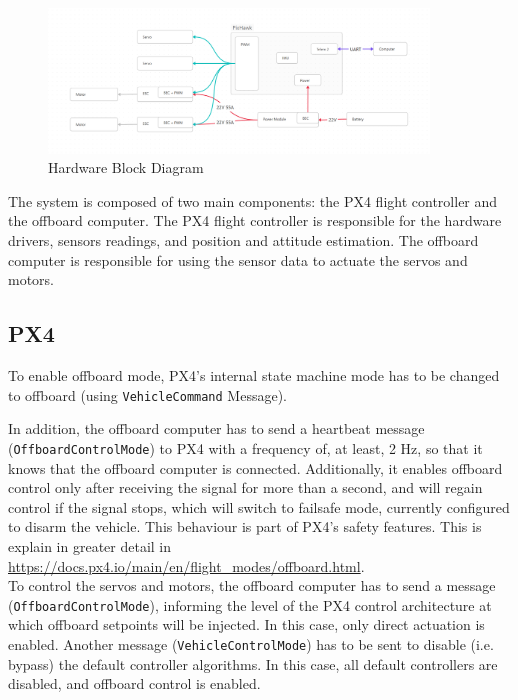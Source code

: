 \documentclass[a4paper]{article}
\begin{document}
\begin{figure}[H]
    \centering
    \includegraphics[width=0.9\textwidth, trim=30 30 30 30, clip]{imgs/Hardware Diagram.png}
    \caption{Hardware Block Diagram}
    \label{fig:hardware_block_diagram}
\end{figure}

The system is composed of two main components: the PX4 flight controller and the offboard computer. 
The PX4 flight controller is responsible for the hardware drivers, sensors readings, and position and attitude estimation. 
The offboard computer is responsible for using the sensor data to actuate the servos and motors. 

\subsection{PX4}

To enable offboard mode, PX4's internal state machine mode has to be changed to offboard (using \verb|VehicleCommand| Message).

In addition, the offboard computer has to send a heartbeat message (\verb|OffboardControlMode|) to PX4 with a frequency of, at least, 2 Hz, so that it knows that the offboard computer is connected. Additionally, it enables offboard control only after receiving the signal for more than a second, and will regain control if the signal stops, which will switch to failsafe mode, currently configured to disarm the vehicle. This behaviour is part of PX4's safety features. 
This is explain in greater detail in \url{https://docs.px4.io/main/en/flight_modes/offboard.html}. \\

To control the servos and motors, the offboard computer has to send a message (\verb|OffboardControlMode|), informing the level of the PX4 control architecture at which offboard setpoints will be injected. In this case, only direct actuation is enabled. 
Another message (\verb|VehicleControlMode|) has to be sent to disable (i.e. bypass) the default controller algorithms. In this case, all default controllers are disabled, and offboard control is enabled. 
\end{document}
